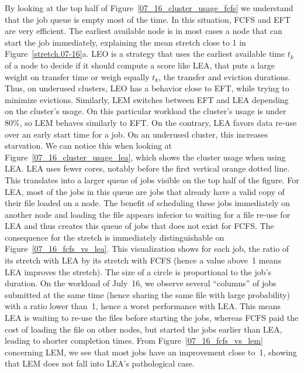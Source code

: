 \documentclass[conference,10pt]{IEEEtran}
\begin{document}
By looking at the top half of Figure~\ref{07_16_cluster_usage_fcfs}
we understand that the job queue is empty most of the time.
In this situation, FCFS and EFT are very efficient. The earliest available node is in
most cases a node that can start the job immediately, explaining the mean stretch close to 1 in Figure~\ref{stretch.07-16}a.
LEO is a strategy that uses the earliest available time $t_k$ of a node to decide if it should compute a score like LEA,
that puts a large weight on transfer time
or weigh equally $t_k$, the transfer and eviction durations. 
Thus, on underused clusters, LEO has a behavior close to EFT, while trying to minimize evictions.
Similarly, LEM switches between EFT and LEA depending on the cluster's usage.
On this particular workload the cluster's usage is under 80\%, so LEM behaves similarly to EFT.
On the contrary, LEA favors data re-use over an early start time for a job.
On an underused cluster, this increases starvation.
We can notice this when looking at
Figure~\ref{07_16_cluster_usage_lea}, which shows the cluster usage when using LEA.
LEA uses fewer cores, notably before the first vertical orange dotted line. 
This translates into a larger queue of jobs visible on the top half of the figure.
For LEA, most of the jobs in this queue are jobs that already have a valid copy of their file loaded on a node. 
The benefit of scheduling these jobs immediately on another node and loading the file appears
inferior to waiting for a file re-use for LEA and thus creates this queue of jobs that does not exist for FCFS. 
The consequence for the stretch is immediately distinguishable on Figure~\ref{07_16_fcfs_vs_lea}.
This visualization shows for each job, the ratio of its stretch with LEA by its stretch with FCFS (hence a value above~1 means LEA improves the stretch).
The size of a circle is proportional to the job's duration.
On the workload of July~16, we observe several ``columns'' of jobs submitted at the same time (hence sharing the same file with large probability)
with a ratio lower than~1, hence a worst performance with LEA.
This means LEA is waiting to re-use the files before starting the jobs,
whereas FCFS paid the cost of loading the file on other nodes, but started the jobs
earlier than LEA, leading to shorter completion times.
From Figure~\ref{07_16_fcfs_vs_lem} concerning LEM, we see that most jobs have an improvement close to~1, showing 
that LEM does not fall into LEA's pathological case.
\end{document}

